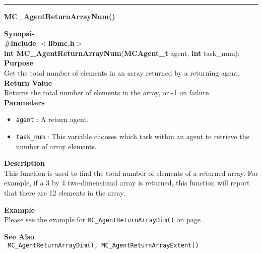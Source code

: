 \noindent
\vspace{5pt}
\rule{6.5in}{0.015in}
\noindent
{}
{\LARGE \bf MC\_AgentReturnArrayNum()}\\
\label{api:MC_AgentReturnArrayNum()}

\noindent
{\bf Synopsis}\\
{\bf \#include $<$libmc.h$>$}\\
{\bf int MC\_AgentReturnArrayNum}({\bf MCAgent\_t} agent, {\bf int} task\_num);\\

\noindent
{\bf Purpose}\\
Get the total number of elements in an array returned by a returning agent.\\

\noindent
{\bf Return Value}\\
Returns the total number of elements in the array, or
-1 on failure.\\

\noindent
{\bf Parameters}
\begin{itemize}
\item \texttt{agent} : A return agent.
\item \texttt{task\_num} : This variable chooses which task within an agent to
retrieve the number of array elements.
\end{itemize}


\noindent
{\bf Description}\\
This function is used to find the total number of elements of a returned 
array. For example, if a 3 by 4 two-dimensional array is returned, this
function will report that there are 12 elements in the array.

\noindent
{\bf Example}\\
\noindent
Please see the example for \texttt{MC\_AgentReturnArrayDim()} on page \pageref{api:MC_AgentReturnArrayDim()}.

\noindent
{\bf See Also}\\
\texttt{
  MC\_AgentReturnArrayDim(), MC\_AgentReturnArrayExtent()
}

